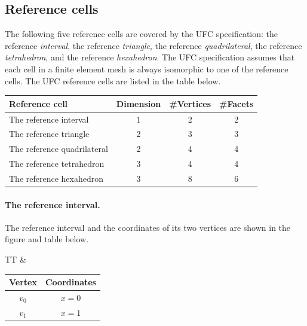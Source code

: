 \subsection{Reference cells}

%


The following five reference cells are covered by the UFC
specification: the reference \emph{interval}, the reference
\emph{triangle}, the reference \emph{quadrilateral}, the reference
\emph{tetrahedron}, and the reference \emph{hexahedron}.  The UFC
specification assumes that each cell in a finite element mesh is
always isomorphic to one of the reference cells. The UFC reference
cells are listed in the table below.

\vspace{0.5cm}
\begin{center}
  \begin{tabular}{lccc}
    \toprule
    Reference cell & Dimension & \#Vertices & \#Facets \\
    \hline
    The reference interval      & 1 & 2 & 2 \\
    The reference triangle      & 2 & 3 & 3 \\
    The reference quadrilateral & 2 & 4 & 4 \\
    The reference tetrahedron   & 3 & 4 & 4 \\
    The reference hexahedron    & 3 & 8 & 6 \\
    \bottomrule
  \end{tabular}
\end{center}

\paragraph{The reference interval.}

The reference interval and the coordinates of its two vertices are
shown in the figure and table below.


\begin{center}
  \begin{tabular}{TT}
    &
    \begin{tabular}{cc}
      \toprule
      Vertex & Coordinates \\
      \hline
      $v_0$ & $x = 0$ \\
      $v_1$ & $x = 1$ \\
      \bottomrule
    \end{tabular}
  \end{tabular}
\end{center}

